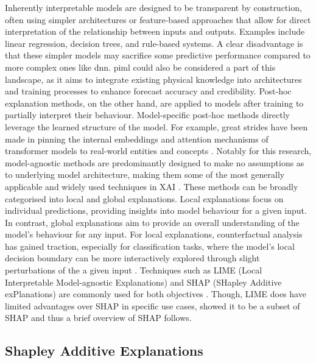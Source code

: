 Inherently interpretable models are designed to be transparent by construction, often using simpler architectures or feature-based approaches that allow for direct interpretation of the relationship between inputs and outputs. Examples include linear regression, decision trees, and rule-based systems. A clear disadvantage is that these simpler models may sacrifice some predictive performance compared to more complex ones like \acrfull{dnn}. \acrshort{piml} could also be considered a part of this landscape, as it aims to integrate existing physical knowledge into architectures and training processes to enhance forecast accuracy and credibility. Post-hoc explanation methods, on the other hand, are applied to models after training to partially interpret their behaviour. Model-specific post-hoc methods directly leverage the learned structure of the model. For example, great strides have been made in pinning the internal embeddings and attention mechanisms of transformer models to real-world entities and concepts . Notably for this research, model-agnostic methods are predominantly designed to make no assumptions as to underlying model architecture, making them some of the most generally applicable and widely used techniques in XAI . These methods can be broadly categorised into local and global explanations. Local explanations focus on individual predictions, providing insights into model behaviour for a given input. In contrast, global explanations aim to provide an overall understanding of the model's behaviour for any input. For local explanations, counterfactual analysis has gained traction, especially for classification tasks, where the model's local decision boundary can be more interactively explored through slight perturbations of the a given input \citep{Mothilal2019}. Techniques such as LIME (Local Interpretable Model-agnostic Explanations) and SHAP (SHapley Additive exPlanations) are commonly used for both objectives \citep{Lundberg2017}. Though, LIME does have limited advantages over SHAP in specific use cases, \cite{Lundberg2017} showed it to be a subset of SHAP and thus a brief overview of SHAP follows.

\subsection{Shapley Additive Explanations}

